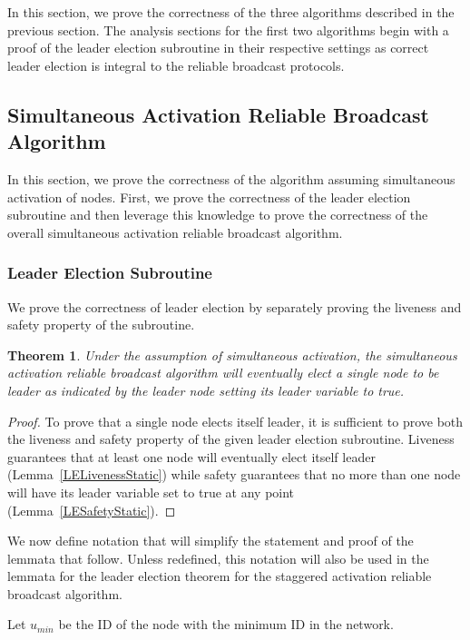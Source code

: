 \documentclass[english]{article}
\newtheorem{theorem}{Theorem}[section]
\begin{document}
In this section, we prove the correctness of the three algorithms described in the previous section. The analysis sections for the first two algorithms begin with a proof of the leader election subroutine in their respective settings as correct leader election is integral to the reliable broadcast protocols.

\subsection {Simultaneous Activation Reliable Broadcast Algorithm}

In this section, we prove the correctness of the algorithm assuming simultaneous activation of nodes. First, we prove the correctness of the leader election subroutine and then leverage this knowledge to prove the correctness of the overall simultaneous activation reliable broadcast algorithm.

\subsubsection{Leader Election Subroutine}

We prove the correctness of leader election by separately proving the liveness and safety property of the subroutine.

\begin{theorem}
\label{LeaderElectionStatic}
Under the assumption of simultaneous activation, the simultaneous activation reliable broadcast algorithm will eventually elect a single node to be leader as indicated by the leader node setting its leader variable to true.
\end{theorem}
\begin{proof}
To prove that a single node elects itself leader, it is sufficient to prove both the liveness and safety property of the given leader election subroutine. Liveness guarantees that at least one node will eventually elect itself leader (Lemma~\ref{LELivenessStatic}) while safety guarantees that no more than one node will have its leader variable set to true at any point (Lemma~\ref{LESafetyStatic}).
\end{proof}

We now define notation that will simplify the statement and proof of the lemmata that follow. Unless redefined, this notation will also be used in the lemmata for the leader election theorem for the staggered activation reliable broadcast algorithm.

\begin{definition}
Let $u_{min}$ be the ID of the node with the minimum ID in the network. 
\end{definition}
\end{document}
